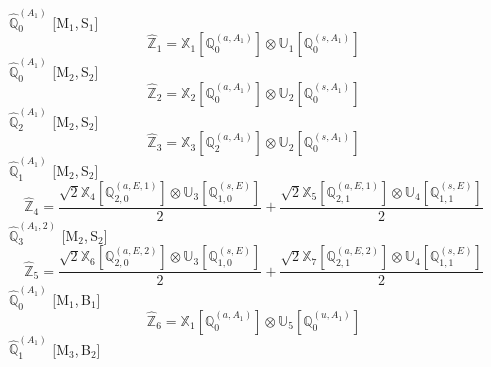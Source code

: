\documentclass[fleqn,10pt,landscape]{article}
\begin{document}
\begin{itemize}
\vspace{4mm}
\noindent {} $\,\,\,\hat{\mathbb{Q}}_{0}^{(A_{1})}$ [M$_{1}$,\,S$_{1}$]
\begin{dmath*}
\hat{\mathbb{Z}}_{1}=\mathbb{X}_{1}[\mathbb{Q}_{0}^{(a,A_{1})}] \otimes\mathbb{U}_{1}[\mathbb{Q}_{0}^{(s,A_{1})}]
\end{dmath*}
\vspace{4mm}
\noindent {} $\,\,\,\hat{\mathbb{Q}}_{0}^{(A_{1})}$ [M$_{2}$,\,S$_{2}$]
\begin{dmath*}
\hat{\mathbb{Z}}_{2}=\mathbb{X}_{2}[\mathbb{Q}_{0}^{(a,A_{1})}] \otimes\mathbb{U}_{2}[\mathbb{Q}_{0}^{(s,A_{1})}]
\end{dmath*}
\vspace{4mm}
\noindent {} $\,\,\,\hat{\mathbb{Q}}_{2}^{(A_{1})}$ [M$_{2}$,\,S$_{2}$]
\begin{dmath*}
\hat{\mathbb{Z}}_{3}=\mathbb{X}_{3}[\mathbb{Q}_{2}^{(a,A_{1})}] \otimes\mathbb{U}_{2}[\mathbb{Q}_{0}^{(s,A_{1})}]
\end{dmath*}
\vspace{4mm}
\noindent {} $\,\,\,\hat{\mathbb{Q}}_{1}^{(A_{1})}$ [M$_{2}$,\,S$_{2}$]
\begin{dmath*}
\hat{\mathbb{Z}}_{4}=\frac{\sqrt{2} \mathbb{X}_{4}[\mathbb{Q}_{2,0}^{(a,E,1)}] \otimes\mathbb{U}_{3}[\mathbb{Q}_{1,0}^{(s,E)}]}{2} + \frac{\sqrt{2} \mathbb{X}_{5}[\mathbb{Q}_{2,1}^{(a,E,1)}] \otimes\mathbb{U}_{4}[\mathbb{Q}_{1,1}^{(s,E)}]}{2}
\end{dmath*}
\vspace{4mm}
\noindent {} $\,\,\,\hat{\mathbb{Q}}_{3}^{(A_{1},2)}$ [M$_{2}$,\,S$_{2}$]
\begin{dmath*}
\hat{\mathbb{Z}}_{5}=\frac{\sqrt{2} \mathbb{X}_{6}[\mathbb{Q}_{2,0}^{(a,E,2)}] \otimes\mathbb{U}_{3}[\mathbb{Q}_{1,0}^{(s,E)}]}{2} + \frac{\sqrt{2} \mathbb{X}_{7}[\mathbb{Q}_{2,1}^{(a,E,2)}] \otimes\mathbb{U}_{4}[\mathbb{Q}_{1,1}^{(s,E)}]}{2}
\end{dmath*}
\vspace{4mm}
\noindent {} $\,\,\,\hat{\mathbb{Q}}_{0}^{(A_{1})}$ [M$_{1}$,\,B$_{1}$]
\begin{dmath*}
\hat{\mathbb{Z}}_{6}=\mathbb{X}_{1}[\mathbb{Q}_{0}^{(a,A_{1})}] \otimes\mathbb{U}_{5}[\mathbb{Q}_{0}^{(u,A_{1})}]
\end{dmath*}
\vspace{4mm}
\noindent {} $\,\,\,\hat{\mathbb{Q}}_{1}^{(A_{1})}$ [M$_{3}$,\,B$_{2}$]
\begin{dmath*}

\end{dmath*}
\end{itemize}
\end{document}
